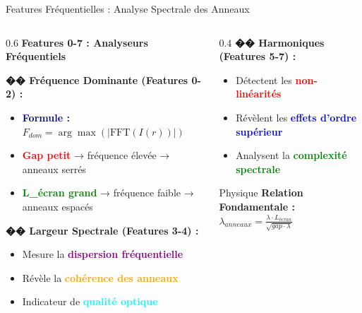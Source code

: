 \documentclass[aspectratio=169]{beamer}
\begin{document}
\begin{frame}{Features Fréquentielles : Analyse Spectrale des Anneaux}
    \begin{columns}
        \begin{column}{0.6\textwidth}
            \textbf{Features 0-7 : Analyseurs Fréquentiels}

            \vspace{0.3cm}
            \textbf{�� Fréquence Dominante (Features 0-2) :}
            \begin{itemize}
                \item \textcolor{darkblue}{\textbf{Formule :}} $F_{dom} = \arg\max(|\text{FFT}(I(r))|)$
                \item \textcolor{red}{\textbf{Gap petit}} → fréquence élevée → anneaux serrés
                \item \textcolor{green}{\textbf{L\_écran grand}} → fréquence faible → anneaux espacés
            \end{itemize}

            \vspace{0.3cm}
            \textbf{�� Largeur Spectrale (Features 3-4) :}
            \begin{itemize}
                \item Mesure la \textcolor{purple}{\textbf{dispersion fréquentielle}}
                \item Révèle la \textcolor{orange}{\textbf{cohérence des anneaux}}
                \item Indicateur de \textcolor{cyan}{\textbf{qualité optique}}
            \end{itemize}
        \end{column}
        \begin{column}{0.4\textwidth}
            \textbf{�� Harmoniques (Features 5-7) :}
            \begin{itemize}
                \item Détectent les \textcolor{red}{\textbf{non-linéarités}}
                \item Révèlent les \textcolor{blue}{\textbf{effets d'ordre supérieur}}
                \item Analysent la \textcolor{green}{\textbf{complexité spectrale}}
            \end{itemize}

            \vspace{0.5cm}
            \begin{alertblock}{Physique}
                \textbf{Relation Fondamentale :} \\
                $\lambda_{anneaux} = \frac{\lambda \cdot L_{écran}}{\sqrt{gap \cdot \lambda}}$
            \end{alertblock}
        \end{column}
    \end{columns}
\end{frame}
\end{document}
